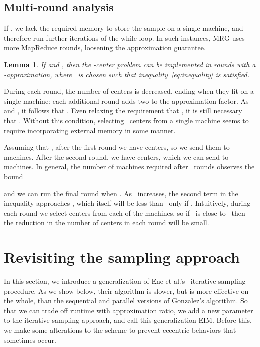 \documentclass[11pt]{article}
\newtheorem{lemma}[theorem]{Lemma}
\newcommand{\ours}{{\sc MRG}\xspace}
\newcommand{\ene}{{\sc EIM}\xspace}
\begin{document}
\subsection{Multi-round analysis}


If , we
lack the required memory to store the sample on a single machine, and therefore run further iterations of the while loop.  
In such instances, \ours uses more MapReduce rounds, loosening the approximation guarantee.


\begin{lemma}
\label{thm:mr_rounds}
If  and , then the -center problem can be implemented in  rounds with a -approximation, where~ is chosen such that inequality~\ref{eq:inequality} is satisfied.
\end{lemma}

During each round, the number of centers is decreased, ending when they fit on a single machine:
each additional round adds two to the approximation factor.
As  and , it follows that .
Even relaxing the requirement that , it is still necessary
that .
Without this condition, selecting~ centers
from a single machine seems to require incorporating external memory in some manner. 


Assuming that , after the first round we have  centers, so we send them to  machines.
After the second round, we have  centers, which we can send to  machines.  
In general,
the number of machines required after~ rounds observes the bound

and we can run the final round when .
As~ increases, the second term in the inequality approaches , which
itself will be less than~ only if .
Intuitively, during each round we select  centers from each of the machines, so if~ is close to~ then the reduction in the number of centers in each round will be small.



\section{Revisiting the sampling approach}

In this section, we introduce a generalization of
Ene et al.'s~\cite{ene2011fast} iterative-sampling procedure.
As we show below, their algorithm is slower, but is more effective on the whole, than the sequential and parallel versions of Gonzalez's algorithm.
So that we can trade off runtime with approximation ratio,
we add a new parameter to the iterative-sampling approach, and call this
generalization \ene.
Before this, we make some alterations to the scheme to prevent eccentric behaviors that sometimes occur.
\end{document}
